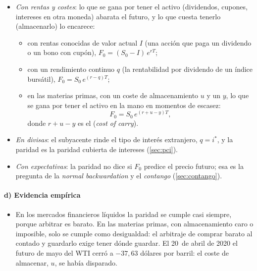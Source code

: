 \documentclass[11pt]{article}
\begin{document}
\begin{itemize}
\item \emph{Con rentas y costes}: lo que se gana por tener el activo (dividendos, cupones, intereses en otra moneda) abarata el futuro, y lo que cuesta tenerlo (almacenarlo) lo encarece\nocite{Hull2022Options}:
  \begin{itemize}
  \item con rentas conocidas de valor actual $I$ (una acción que paga un dividendo o un bono con cupón), $F_0=(S_0-I)\,e^{rT}$;
  \item con un rendimiento continuo $q$ (la rentabilidad por dividendo de un índice bursátil), $F_0=S_0\,e^{(r-q)T}$;
  \item en las materias primas, con un coste de almacenamiento $u$ y un  $y$, lo que se gana por tener el activo en la mano en momentos de escasez\nocite{Kaldor1939Speculation,Working1949Theory}:
  \begin{equation}\label{eq:coste-mantenimiento}
  F_0=S_0\,e^{(r+u-y)T},
  \end{equation}
  donde $r+u-y$ es el  (\emph{cost of carry}).
  \end{itemize}
\item \emph{En divisas}: el subyacente rinde el tipo de interés extranjero, $q=i^{*}$, y la paridad es la paridad cubierta de intereses (\ref{sec:pci}).
\item \emph{Con expectativas}: la paridad no dice si $F_0$ predice el precio futuro; esa es la pregunta de la \emph{normal backwardation} y el \emph{contango} (\ref{sec:contango}).
\end{itemize}

\paragraph{d) Evidencia empírica}

\begin{itemize}
\item En los mercados financieros líquidos la paridad se cumple casi siempre, porque arbitrar es barato. En las materias primas, con almacenamiento caro o imposible, solo se cumple como desigualdad: el arbitraje de comprar barato al contado y guardarlo exige tener dónde guardar. El 20~de abril de 2020 el futuro de mayo del WTI cerró a $-37{,}63$ dólares por barril: el coste de almacenar, $u$, se había disparado\nocite{CFTC2020WTI}.
\end{itemize}
\end{document}
